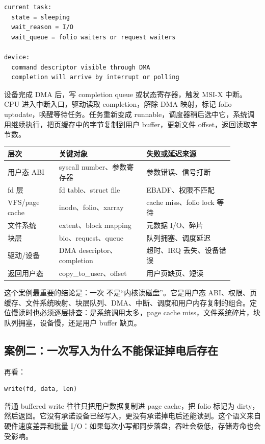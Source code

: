 \begin{lstlisting}
current task:
  state = sleeping
  wait_reason = I/O
  wait_queue = folio waiters or request waiters

device:
  command descriptor visible through DMA
  completion will arrive by interrupt or polling
\end{lstlisting}

设备完成 DMA 后，写 completion queue 或状态寄存器，触发 MSI-X 中断。CPU 进入中断入口，驱动读取 completion，解除 DMA 映射，标记 folio uptodate，唤醒等待任务。任务重新变成 runnable，调度器稍后选中它，系统调用继续执行，把页缓存中的字节复制到用户 buffer，更新文件 offset，返回读取字节数。

\begin{longtable}{p{0.2\linewidth}p{0.34\linewidth}p{0.34\linewidth}}
\toprule
层次 & 关键对象 & 失败或延迟来源 \\
\midrule
用户态 ABI & syscall number、参数寄存器 & 参数错误、信号打断 \\
fd 层 & fd table、struct file & EBADF、权限不匹配 \\
VFS/page cache & inode、folio、xarray & cache miss、folio lock 等待 \\
文件系统 & extent、block mapping & 元数据 I/O、碎片 \\
块层 & bio、request、queue & 队列拥塞、调度延迟 \\
驱动/设备 & DMA descriptor、completion & 超时、IRQ 丢失、设备错误 \\
返回用户态 & copy\_to\_user、offset & 用户页缺页、短读 \\
\bottomrule
\end{longtable}

这个案例最重要的结论是：一次  不是“内核读磁盘”。它是用户态 ABI、权限、页缓存、文件系统映射、块层队列、DMA、中断、调度和用户内存复制的组合。定位慢读时也必须逐层排查：是系统调用太多，page cache miss，文件系统碎片，块队列拥塞，设备慢，还是用户 buffer 缺页。

\subsection{案例二：一次写入为什么不能保证掉电后存在}

再看：

\begin{lstlisting}
write(fd, data, len)
\end{lstlisting}

普通 buffered write 往往只把用户数据复制进 page cache，把 folio 标记为 dirty，然后返回。它没有承诺设备已经写入，更没有承诺掉电后还能读到。这个语义来自硬件速度差异和批量 I/O：如果每次小写都同步落盘，吞吐会极低，存储寿命也会受影响。

